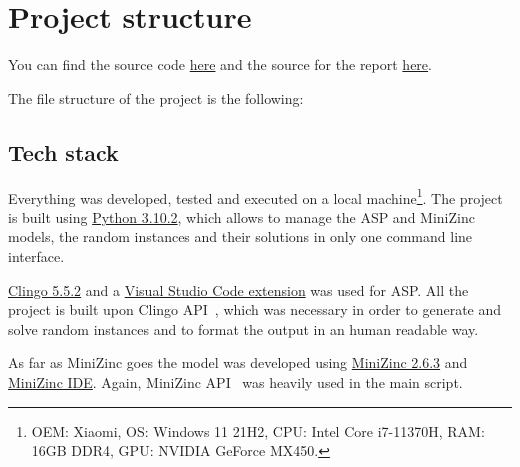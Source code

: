 \section{Project structure}
You can find the source code \href{https://github.com/pinzauti/automated-reasoning}{here} and the source for the report \href{https://github.com/pinzauti/automated-reasoning-report}{here}.

The file structure of the project is the following:

\subsection{Tech stack}

Everything was developed, tested and executed on a local machine\footnote{OEM: Xiaomi, OS: Windows 11 21H2, CPU: Intel Core i7-11370H, RAM: 16GB DDR4, GPU: NVIDIA GeForce MX450.}. The project is built using \href{https://www.python.org/downloads/release/python-3102/}{Python 3.10.2}, which allows to manage the ASP and MiniZinc models, the random instances and their solutions in only one command line interface.

\href{https://github.com/potassco/clingo/releases/tag/v5.5.2}{Clingo 5.5.2} and a \href{https://marketplace.visualstudio.com/items?itemName=abelcour.asp-syntax-highlight}{Visual Studio Code extension} was used for ASP. All the project is built upon Clingo API~\cite{ClingoAPI}, which was necessary in order to generate and solve random instances and to format the output in an human readable way.

As far as MiniZinc goes the model was developed using \href{https://github.com/MiniZinc/libminizinc/releases/tag/2.6.3}{MiniZinc 2.6.3} and \href{https://www.minizinc.org/ide/}{MiniZinc IDE}. Again, MiniZinc API~\cite{MiniZincPython} was heavily used in the main script.


